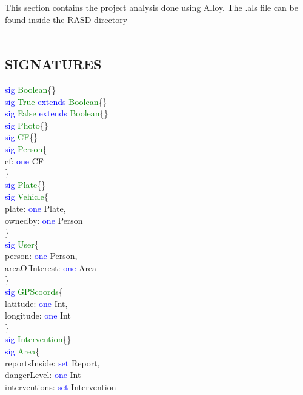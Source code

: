 This section contains the project analysis done using Alloy. The .als file can be found inside the RASD directory \\
\\
\subsection{SIGNATURES}
\textcolor{blue}{sig}
\textcolor{green}{Boolean}\{\} \\
\textcolor{blue}{sig}
\textcolor{green}{True}
\textcolor{blue}{extends}
\textcolor{green}{Boolean}\{\} \\ 
\textcolor{blue}{sig}
\textcolor{green}{False}
\textcolor{blue}{extends}
\textcolor{green}{Boolean}\{\} \\
\textcolor{blue}{sig}
\textcolor{green}{Photo}\{\} \\
\textcolor{blue}{sig}
\textcolor{green}{CF}\{\} \\
\textcolor{blue}{sig}
\textcolor{green}{Person}\{ \\
cf: \textcolor{blue}{one} CF\\
\} \\
\textcolor{blue}{sig}
\textcolor{green}{Plate}\{\} \\
\textcolor{blue}{sig}
\textcolor{green}{Vehicle}\{ \\
plate: \textcolor{blue}{one} Plate,\\
ownedby: \textcolor{blue}{one} Person\\
\} \\
\textcolor{blue}{sig}
\textcolor{green}{User}\{ \\
person: \textcolor{blue}{one} Person,\\
areaOfInterest: \textcolor{blue}{one} Area\\ 
\} \\
\textcolor{blue}{sig}
\textcolor{green}{GPScoords}\{ \\
latitude: \textcolor{blue}{one} Int,\\
longitude: \textcolor{blue}{one} Int\\ 
\} \\
\textcolor{blue}{sig}
\textcolor{green}{Intervention}\{\} \\
\textcolor{blue}{sig}
\textcolor{green}{Area}\{ \\
reportsInside: \textcolor{blue}{set} Report,\\
dangerLevel: \textcolor{blue}{one} Int\\ 
interventions: \textcolor{blue}{set} Intervention\\
